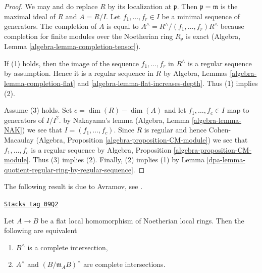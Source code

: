 \begin{proof}

We may and do replace $R$ by its localization at $\mathfrak p$.
Then $\mathfrak p = \mathfrak m$ is the maximal ideal of $R$
and $A = R/I$. Let $f_1, \ldots, f_r \in I$ be a minimal sequence
of generators.  The completion of $A$ is equal to
$A^\wedge = R^\wedge/(f_1, \ldots, f_r)R^\wedge$
because completion for finite modules over the Noetherian ring
$R_\mathfrak p$ is exact
(Algebra, Lemma \ref{algebra-lemma-completion-tensor}).

\medskip\noindent
If (1) holds, then the image of the sequence $f_1, \ldots, f_r$ in $R^\wedge$
is a regular sequence by assumption. Hence it is a regular sequence
in $R$ by Algebra, Lemmas \ref{algebra-lemma-completion-flat} and
\ref{algebra-lemma-flat-increases-depth}. Thus (1) implies (2).

\medskip\noindent
Assume (3) holds. Set $c = \dim(R) - \dim(A)$ and let $f_1, \ldots, f_c \in I$
map to generators of $I/I^2$. by Nakayama's lemma
(Algebra, Lemma \ref{algebra-lemma-NAK})
we see that $I = (f_1, \ldots, f_c)$. Since $R$ is regular and hence
Cohen-Macaulay (Algebra, Proposition \ref{algebra-proposition-CM-module})
we see that $f_1, \ldots, f_c$ is a regular sequence by
Algebra, Proposition \ref{algebra-proposition-CM-module}.
Thus (3) implies (2).
Finally, (2) implies (1) by
Lemma \ref{dpa-lemma-quotient-regular-ring-by-regular-sequence}.
\end{proof}

The following result is due to Avramov, see \cite{Avramov}.

\begin{proposition}[Avramov]
\label{dpa-proposition-avramov}
\href{https://stacks.math.columbia.edu/tag/09Q2}{\texttt{Stacks tag 09Q2}}

Let $A \to B$ be a flat local homomorphism of Noetherian local rings.
Then the following are equivalent
\begin{enumerate}
\item $B^\wedge$ is a complete intersection,
\item $A^\wedge$ and $(B/\mathfrak m_A B)^\wedge$ are complete intersections.
\end{enumerate}
\end{proposition}

